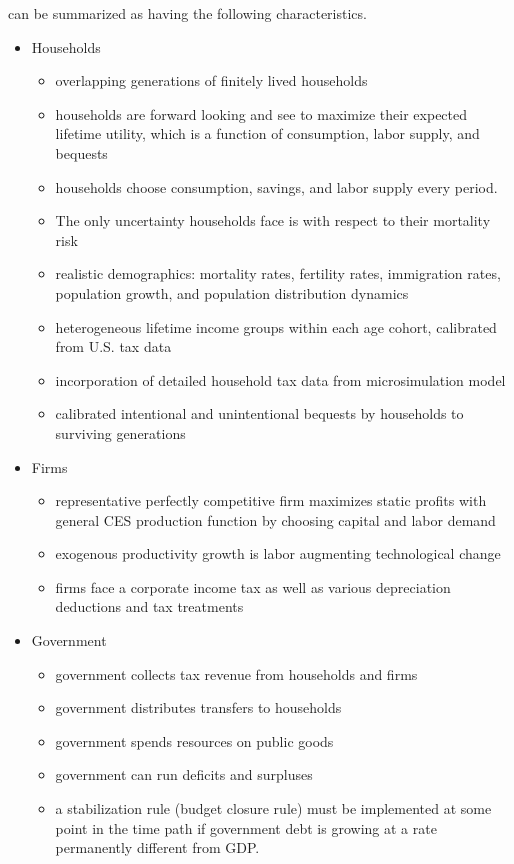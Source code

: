 \ogindia can be summarized as having the following characteristics.
\begin{itemize}
  \item Households
  \begin{itemize}
    \item overlapping generations of finitely lived households
    \item households are forward looking and see to maximize their expected lifetime utility, which is a function of consumption, labor supply, and bequests
    \item households choose consumption, savings, and labor supply every period.
    \item The only uncertainty households face is with respect to their mortality risk
    \item realistic demographics: mortality rates, fertility rates, immigration rates, population growth, and population distribution dynamics
    \item heterogeneous lifetime income groups within each age cohort, calibrated from U.S. tax data
    \item incorporation of detailed household tax data from \taxcalc microsimulation model
    \item calibrated intentional and unintentional bequests by households to surviving generations
  \end{itemize}
  \item Firms
  \begin{itemize}
    \item representative perfectly competitive firm maximizes static profits with general CES production function by choosing capital and labor demand
    \item exogenous productivity growth is labor augmenting technological change
    \item firms face a corporate income tax as well as various depreciation deductions and tax treatments
  \end{itemize}
  \item Government
  \begin{itemize}
    \item government collects tax revenue from households and firms
    \item government distributes transfers to households
    \item government spends resources on public goods
    \item government can run deficits and surpluses
    \item a stabilization rule (budget closure rule) must be implemented at some point in the time path if government debt is growing at a rate permanently different from GDP.

\end{itemize}
\end{itemize}
